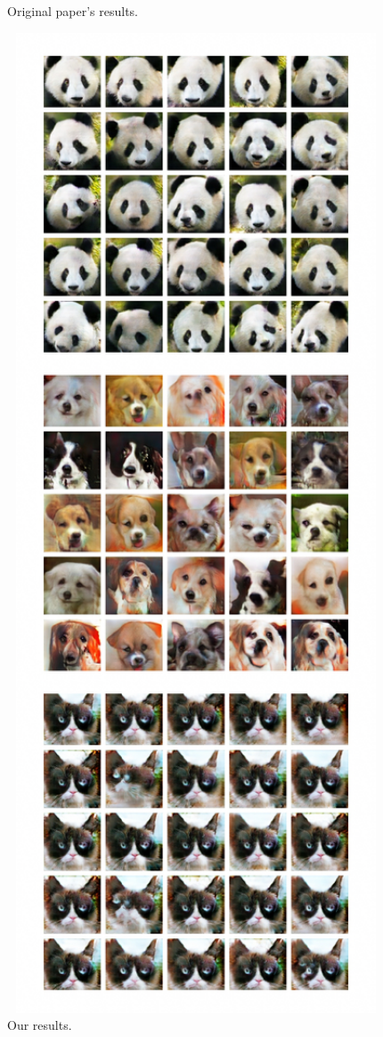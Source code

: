 \documentclass[12pt]{article}
\begin{document}
\begin{center}
\begin{minipage}[t]{0.48\textwidth}
\begin{figure}[H]
			\caption{Original paper's results.}
		\end{figure}
	\end{minipage}
	\begin{minipage}[t]{0.48\textwidth} 
		\begin{figure}[H]
			\includegraphics[width=1\textwidth]{Images/experiment.jpg}
			\caption{Our results.}
		\end{figure}
	\end{minipage}
\end{center}
\end{document}
